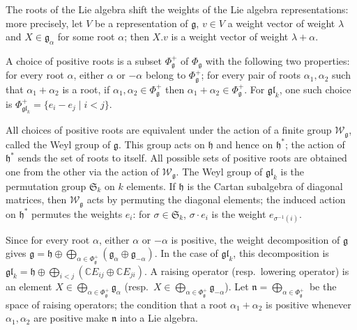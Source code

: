 The roots of the Lie algebra shift the weights of the Lie algebra representations: more precisely, let $V$ be a representation of $\mathfrak{g}$, $v\in V$ a weight vector of weight $\lambda$ and $X\in\mathfrak{g}_{\alpha}$ for some root $\alpha$; then $X.v$ is a weight vector of weight $\lambda+\alpha$.





A choice of positive roots is a subset $\Phi_{\mathfrak{g}}^{+}$ of $\Phi_{\mathfrak{g}}$ with the following two properties: for every root $\alpha$, either $\alpha$ or $-\alpha$ belong to $\Phi_{\mathfrak{g}}^{+}$; for every pair of roots $\alpha_{1},\alpha_{2}$ such that $\alpha_{1}+\alpha_{2}$ is a root, if $\alpha_{1},\alpha_{2}\in\Phi_{\mathfrak{g}}^{+}$ then $\alpha_{1}+\alpha_{2}\in\Phi_{\mathfrak{g}}^{+}$. For $\mathfrak{gl}_{k}$, one such choice is $\Phi_{\mathfrak{gl}_{k}}^{+}=\{e_{i}-e_{j}\mid i<j\}$.





All choices of positive roots are equivalent under the action of a finite group $\mathcal{W}_{\mathfrak{g}}$, called the Weyl group of $\mathfrak{g}$. This group acts on $\mathfrak{h}$ and hence on $\mathfrak{h}^{*}$; the action of $\mathfrak{h}^{*}$ sends the set of roots to itself. All possible sets of positive roots are obtained one from the other via the action of $\mathcal{W}_{\mathfrak{g}}$. The Weyl group of $\mathfrak{gl}_{k}$ is the permutation group $\mathfrak{S}_{k}$ on $k$ elements. If $\mathfrak{h}$ is the Cartan subalgebra of diagonal matrices, then $\mathcal{W}_{\mathfrak{g}}$ acts by permuting the diagonal elements; the induced action on $\mathfrak{h}^{*}$ permutes the weights $e_{i}$: for $\sigma\in\mathfrak{S}_{k}$, $\sigma\cdot e_{i}$ is the weight $e_{\sigma^{-1}(i)}$.





Since for every root $\alpha$, either $\alpha$ or $-\alpha$ is positive, the weight decomposition of $\mathfrak{g}$ gives $\mathfrak{g}=\mathfrak{h}\oplus\bigoplus_{\alpha\in\Phi_{\mathfrak{g}}^{+}}(\mathfrak{g}_{\alpha}\oplus\mathfrak{g}_{-\alpha})$. In the case of $\mathfrak{gl}_{k}$, this decomposition is $\mathfrak{gl}_{k}=\mathfrak{h}\oplus\bigoplus_{i<j}(\mathbb{C}E_{ij}\oplus\mathbb{C}E_{ji})$. A raising operator (resp. lowering operator) is an element $X\in\bigoplus_{\alpha\in\Phi_{\mathfrak{g}}^{+}}\mathfrak{g}_{\alpha}$ (resp. $X\in\bigoplus_{\alpha\in\Phi_{\mathfrak{g}}^{+}}\mathfrak{g}_{-\alpha}$). Let $\mathfrak{n}=\bigoplus_{\alpha\in\Phi_{\mathfrak{g}}^{+}}$ be the space of raising operators; the condition that a root $\alpha_{1}+\alpha_{2}$ is positive whenever $\alpha_{1},\alpha_{2}$ are positive make $\mathfrak{n}$ into a Lie algebra.





